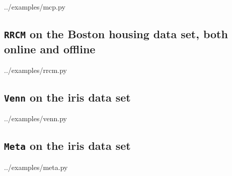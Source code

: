 \documentclass[twoside,11pt]{article}
\begin{document}
\begin{appendices}
  
  {../examples/mcp.py}

  \subsection{\texttt{RRCM} on the Boston housing data set,
              both online and offline}

  
  {../examples/rrcm.py}

  \subsection{\texttt{Venn} on the iris data set}

  
  {../examples/venn.py}

  \subsection{\texttt{Meta} on the iris data set}

  
  {../examples/meta.py}

\end{appendices}


\end{document}
